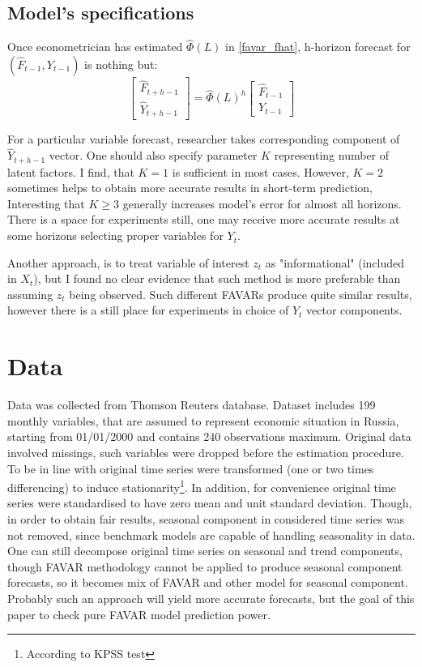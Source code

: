 \documentclass[a4paper, 14pt]{article}
\begin{document}
\subsection{Model's specifications}
Once econometrician has estimated $\hat\Phi(L)$ in \eqref{favar_fhat}, h-horizon forecast for $(\hat{F}_{t-1}, Y_{t-1})$ is nothing but:
\[\begin{bmatrix}
\hat{F}_{t+h-1} \\
\hat{Y}_{t+h-1}
\end{bmatrix} = \hat\Phi (L) ^{h}
\begin{bmatrix}
\hat{F}_{t-1} \\
Y_{t-1}
\end{bmatrix}\]

For a particular variable forecast, researcher takes corresponding component of $\hat{Y}_{t+h-1}$ vector. One should also specify parameter $K$ representing number of latent factors. I find, that $K=1$ is sufficient in most cases. However, $K=2$ sometimes helps to obtain more accurate results in short-term prediction, Interesting that $K\ge 3$ generally increases model's error for almost all horizons. There is a space for experiments still, one may receive more accurate results at some horizons selecting proper variables for $Y_t$.

Another approach, is to treat variable of interest $z_t$ as "informational" (included in $X_t$), but I found no clear evidence that such method is more preferable than assuming $z_t$ being observed. Such different FAVARs produce quite similar results, however there is a still place for experiments in choice of $Y_t$ vector components. 

\section{Data}

Data was collected from Thomson Reuters database. Dataset includes 199 monthly variables, that are assumed to represent economic situation in Russia, starting from 01/01/2000 and contains 240 observations maximum. Original data involved missings, such variables were dropped before the estimation procedure. To be in line with \cite{bernanke2005measuring} original time series were transformed (one or two times differencing) to induce stationarity\footnote{According to KPSS test}. In addition, for convenience original time series were standardised to have zero mean and unit standard deviation. Though, in order to obtain fair results, seasonal component in considered time series was not removed, since benchmark models are capable of handling seasonality in data. One can still decompose original time series on seasonal and trend components, though FAVAR methodology cannot be applied to produce seasonal component forecasts, so it becomes mix of FAVAR and other model for seasonal component. Probably such an approach will yield more accurate forecasts, but the goal of this paper to check pure FAVAR model prediction power.
\end{document}
